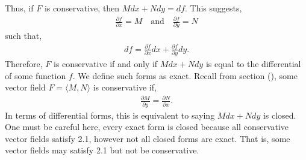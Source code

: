 Thus, if $F$ is conservative, then $Mdx + Ndy = df$.
This suggests,
\begin{align*}
    \frac{\partial f}{\partial x} = M \quad \text{and} \quad \frac{\partial f}{\partial y} = N
\end{align*}
such that, 
\begin{align*}
    df = \frac{\partial f}{\partial x}dx + \frac{\partial f}{\partial y}dy.
\end{align*}
Therefore, $F$ is conservative if and only if $Mdx + Ndy$ is equal to the differential of some function $f$.
We define such forms as exact. 
Recall from section (), some vector field $F = \langle M, N \rangle $ is conservative if, 
\begin{align}
    \frac{\partial M}{\partial y} = \frac{\partial N}{\partial x}.
\end{align}
In terms of differential forms, this is equivalent to saying $Mdx + Ndy$ is closed. 
One must be careful here, every exact form is closed because all conservative vector fields satisfy 2.1, however not all closed forms are exact.
That is, some vector fields may satisfy 2.1 but not be conservative.
